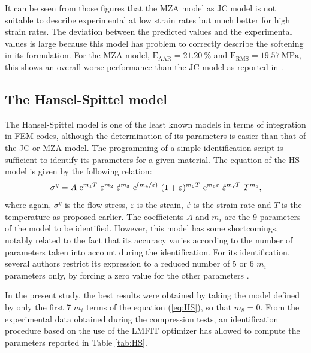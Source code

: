 \documentclass[twoside,english,1p,final,sort&compress]{elsarticle}
\theoremstyle{plain}
\DeclareRobustCommand{\e}[1]{{\rm e}^{#1}}
\DeclareRobustCommand{\mdot}[1]{\accentset{\mbox{\bfseries .}}{#1}}
\DeclareRobustCommand{\RMSE}{\text{E}_\text{RMS}}
\DeclareRobustCommand{\AARE}{\text{E}_\text{AAR}}
\begin{document}
It can be seen from those figures that the MZA model as JC model is not suitable to describe experimental at low strain rates but much better for high strain rates.
The deviation between the predicted values and the experimental values is large because this model has problem to correctly describe the softening in its formulation.
For the MZA model, $\AARE=21.20~\%$ and $\RMSE=19.57~\text{MPa}$, this shows an overall worse performance than the JC model as reported in \cite{TizeMha-2022}.

\subsection{The Hansel-Spittel model\label{sec:HSmodel}}

The Hansel-Spittel model \cite{Hensel-1978} is one of the least known models in terms of integration in FEM codes, although the determination of its parameters is easier than that of the JC or MZA model.
The programming of a simple identification script is sufficient to identify its parameters for a given material.
The equation of the HS model is given by the following relation:
\begin{equation}
\sigma^y = A~\e{m_1T}~\varepsilon^{m_2}~\mdot\varepsilon^{m_3}~\e{({m_4}/{\varepsilon})}~(1+\varepsilon)^{m_5T}~\e{m_6\varepsilon}~\mdot\varepsilon^{m_7T}~T^{m_8}, \label{eq:HS}
\end{equation}
where again, $\sigma^y$ is the flow stress, $\varepsilon$ is the strain, $\mdot\varepsilon$ is the strain rate and $T$ is the temperature as proposed earlier.
The coefficients $A$ and $m_i$ are the 9 parameters of the model to be identified.
However, this model has some shortcomings, notably related to the fact that its accuracy varies according to the number of parameters taken into account during the identification.
For its identification, several authors restrict its expression to a reduced number of 5 or 6 $m_i$ parameters only, by forcing a zero value for the other parameters \cite{Chadha-2018, Mehtedi-2015, Rudnytskyj-2020}.

In the present study, the best results were obtained by taking the model defined by only the first 7 $m_i$ terms of the equation (\ref{eq:HS}), so that $m_8=0$.
From the experimental data obtained during the compression tests, an identification procedure based on the use of the LMFIT optimizer \cite{Newville-2016} has allowed to compute the parameters reported in Table \ref{tab:HS}.
\end{document}
